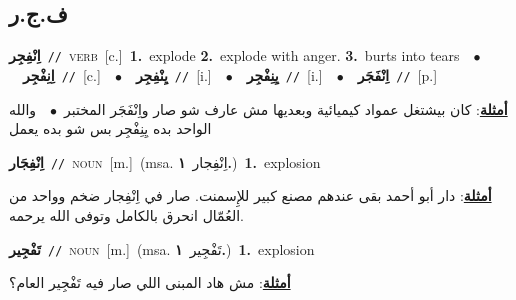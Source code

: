 \documentclass[10pt,a4paper,twoside]{article} %
\begin{document}
\begin{multicols}{2}
{{{{{{{{\vspace{-3mm}
\subsection*{\color{blue}\foreignlanguage{arabic}{ف.ج.ر}\color{blue}{}} 

{\setlength\topsep{0pt}\textbf{\foreignlanguage{arabic}{اِنْفِجِر}}\ {\color{gray}\texttt{//}\color{black}}\ \textsc{verb}\ [c.]\ \textbf{1.}~explode  \textbf{2.}~explode with anger.  \textbf{3.}~burts into tears\ \ $\bullet$\ \ \setlength\topsep{0pt}\textbf{\foreignlanguage{arabic}{اِنِفْجِر}}\ {\color{gray}\texttt{//}\color{black}}\ [c.]\ \ $\bullet$\ \ \setlength\topsep{0pt}\textbf{\foreignlanguage{arabic}{يِنْفِجِر}}\ {\color{gray}\texttt{//}\color{black}}\ [i.]\ \ $\bullet$\ \ \setlength\topsep{0pt}\textbf{\foreignlanguage{arabic}{يِنِفْجِر}}\ {\color{gray}\texttt{//}\color{black}}\ [i.]\ \ $\bullet$\ \ \setlength\topsep{0pt}\textbf{\foreignlanguage{arabic}{اِنْفَجَر}}\ {\color{gray}\texttt{//}\color{black}}\ [p.]\  \begin{flushright}\color{gray}\foreignlanguage{arabic}{\textbf{\underline{\foreignlanguage{arabic}{أمثلة}}}: كان بيشتغل عمواد كيميائية وبعديها مش عارف شو صار واِنْفَجَر المختبر\ $\bullet$\ \  والله الواحد بده يِنِفْجِر بس شو بده يعمل}\end{flushright}\color{black}} \vspace{2mm}

{\setlength\topsep{0pt}\textbf{\foreignlanguage{arabic}{اِنْفِجَار}}\ {\color{gray}\texttt{//}\color{black}}\ \textsc{noun}\ [m.]\ \color{gray}(msa. \foreignlanguage{arabic}{اِنْفِجار}~\foreignlanguage{arabic}{\textbf{١.}})\color{black}\ \textbf{1.}~explosion\  \begin{flushright}\color{gray}\foreignlanguage{arabic}{\textbf{\underline{\foreignlanguage{arabic}{أمثلة}}}: دار أبو أحمد بقى عندهم مصنع كبير للإِسمنت. صار في اِنْفِجار ضخم وواحد من العُمّال انحرق بالكامل وتوفى الله يرحمه.}\end{flushright}\color{black}} \vspace{2mm}

{\setlength\topsep{0pt}\textbf{\foreignlanguage{arabic}{تَفْجِير}}\ {\color{gray}\texttt{//}\color{black}}\ \textsc{noun}\ [m.]\ \color{gray}(msa. \foreignlanguage{arabic}{تَفْجِير}~\foreignlanguage{arabic}{\textbf{١.}})\color{black}\ \textbf{1.}~explosion\  \begin{flushright}\color{gray}\foreignlanguage{arabic}{\textbf{\underline{\foreignlanguage{arabic}{أمثلة}}}: مش هاد المبنى اللي صار فيه تَفْجِير العام؟}\end{flushright}\color{black}} \vspace{2mm}

}}}}}}}}
\end{multicols}
\end{document}

